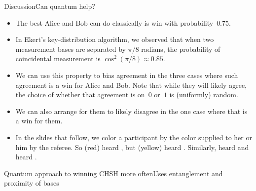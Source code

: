 {\begin{frame}{Discussion}{Can quantum help?}
\begin{itemize}[<+->]
    \item The best Alice and Bob can do classically is win with probability~$0.75$.
    \item In Ekert's key-distribution algorithm, we observed that when two measurement bases are separated by $\pi/8$ radians, the probability of coincidental measurement is $\cos^{2}(\pi/8)\approx 0.85$.
    \item We can use this property to bias agreement in the three cases where such agreement is a win for Alice and Bob.  Note that while they will likely agree, the choice of whether that agreement is on~$0$ or~$1$ is (uniformly) random.
    \item We can also arrange for them to likely disagree in the one case where that is a win for them.
    \item In the slides that follow, we color a participant by the color supplied to her or him by the referee. So (red)  heard , but (yellow)  heard .  Similarly,  heard  and  heard .
\end{itemize}
    
\end{frame}

\begin{frame}{Quantum approach to winning CHSH more often}{Uses entanglement and proximity of bases}


\end{frame}}
